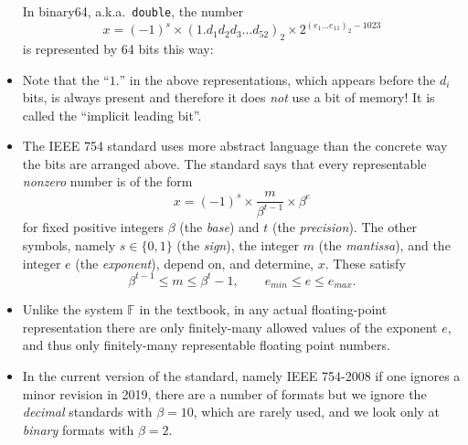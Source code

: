 \documentclass[11pt]{amsart}
\begin{document}
\begin{itemize}
\noindent In binary64, a.k.a.~\texttt{double}, the number
       $$x = (-1)^s \times \left(1.d_1 d_2 d_3 \dots d_{52}\right)_{2} \times 2^{\left(e_1\dots e_{11}\right)_2 - 1023}$$
is represented by 64 bits this way:

\medskip

\item Note that the ``$1.$'' in the above representations, which appears before the $d_i$ bits, is always present and therefore it does \emph{not} use a bit of memory!  It is called the ``implicit leading bit''.

\item The IEEE 754 standard uses more abstract language than the concrete way the bits are arranged above.  The standard says that every representable \emph{nonzero} number is of the form
\begin{equation}
x = (-1)^s \times \frac{m}{\beta^{t-1}} \times \beta^e  \label{ieeeform}
\end{equation}
for fixed positive integers $\beta$ (the \emph{base}) and $t$ (the \emph{precision}).  The other symbols, namely $s\in\{0,1\}$ (the \emph{sign}), the integer $m$ (the \emph{mantissa}), and the integer $e$ (the \emph{exponent}), depend on, and determine, $x$.  These satisfy
\begin{equation}
\beta^{t-1} \le m \le \beta^t - 1, \qquad e_{min} \le e \le e_{max}.  \label{ieeeconstraint}
\end{equation}

\item Unlike the system $\mathbb{F}$ in the textbook, in any actual floating-point representation there are only finitely-many allowed values of the exponent $e$, and thus only finitely-many representable floating point numbers.

\item In the current version of the standard, namely IEEE 754-2008 if one ignores a minor revision in 2019, there are a number of formats but we ignore the \emph{decimal} standards with $\beta=10$, which are rarely used, and we look only at \emph{binary} formats with $\beta=2$.


\end{itemize}
\end{document}

